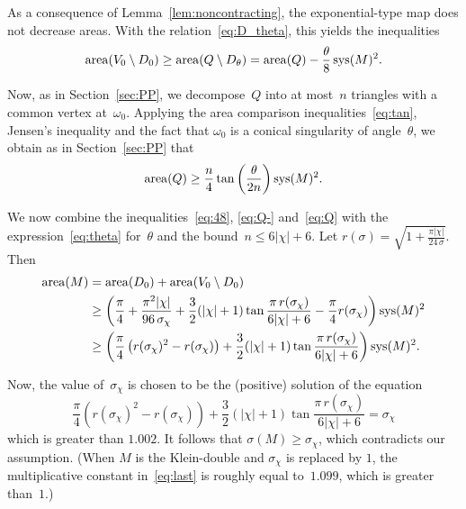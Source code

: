 \documentclass[12pt,reqno]{amsart}
\theoremstyle{definition}
\numberwithin{equation}{section}
\DeclareMathOperator{\area}{{\rm area}}
\DeclareMathOperator{\sys}{{\rm sys}}
\numberwithin{equation}{section}
\begin{document}
As a consequence of Lemma~\ref{lem:noncontracting}, the exponential-type map does not decrease areas.
With the relation~\eqref{eq:D_theta}, this yields the inequalities
\begin{equation} \label{eq:Q-}
\area(V_0 \setminus D_0) \geq \area(Q \setminus D_\theta) = \area(Q) - \frac{\theta}{8} \sys(M)^2.       %
\end{equation}

Now, as in Section~\ref{sec:PP}, we decompose~$Q$ into at most~$n$ triangles with a common vertex at~$\omega_0$.
Applying the area comparison inequalities~\eqref{eq:tan}, Jensen's inequality and the fact that $\omega_0$ is a conical singularity of angle~$\theta$, we obtain as in Section~\ref{sec:PP} that
\begin{equation} \label{eq:Q}
\area(Q) \geq \frac{n}{4} \tan\left( \frac{\theta}{2n} \right) \sys(M)^2.
\end{equation}

We now combine the inequalities~\eqref{eq:48}, \eqref{eq:Q-}
and~\eqref{eq:Q} with the expression~\eqref{eq:theta} for~$\theta$ and
the bound~$n \leq 6|\chi|+6$.  Let
$r(\sigma)=\sqrt{1+\frac{\pi|\chi|}{24\,\sigma}}$.  Then
\begin{align}
\area(M) & = \area(D_0) + \area(V_0 \setminus D_0) \nonumber \\ & \geq
\left( \frac{\pi}{4} + \frac{\pi^2 |\chi|}{96 \, \sigma_\chi} +
\frac{3}{2} (|\chi|+1) \tan \frac{\pi\, r(\sigma_\chi)}{6|\chi|+6} -
\frac{\pi}{4} r(\sigma_\chi) \right) \sys(M)^2 \nonumber \\ & \geq
\left( \frac{\pi}{4} \left( r(\sigma_\chi)^2-r(\sigma_\chi) \right) +
\frac{3}{2} (|\chi|+1) \tan \frac{\pi\, r(\sigma_\chi)}{6|\chi|+6}
\right) \sys(M)^2.  \label{eq:last}
\end{align}

Now, the value of~$\sigma_\chi$ is chosen to be the (positive) solution of the equation
\begin{equation} \label{eq:sigma0}
\frac{\pi}{4} \left( r(\sigma_\chi)^2-r(\sigma_\chi) \right) + \frac{3}{2} (|\chi|+1) \tan \frac{\pi\, r(\sigma_\chi)}{6|\chi|+6} = \sigma_\chi
\end{equation}
which is greater than $1.002$.  It follows that $\sigma(M) \geq
\sigma_\chi$, which contradicts our assumption.  (When $M$ is the
Klein-double and $\sigma_\chi$ is replaced by $1$, the multiplicative
constant in~\eqref{eq:last} is roughly equal to~$1.099$, which is
greater than~$1$.)
\end{document}
